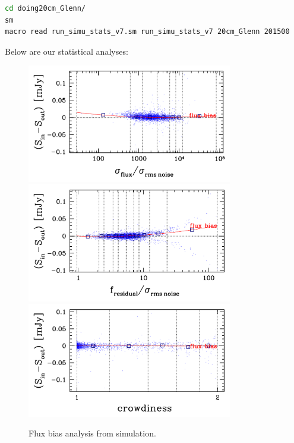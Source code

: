 \documentclass[11pt,a4paper]{article}
\begin{document}
\begin{lstlisting}[language=bash]
cd doing20cm_Glenn/
sm
macro read run_simu_stats_v7.sm run_simu_stats_v7 20cm_Glenn 201500
\end{lstlisting}

Below are our statistical analyses:

\begin{figure}[H]
	\includegraphics[width=0.8\textwidth]{galsim_20cm_Glenn_fbias_1}
	\includegraphics[width=0.8\textwidth]{galsim_20cm_Glenn_fbias_2}
	\includegraphics[width=0.8\textwidth]{galsim_20cm_Glenn_fbias_3}
	\caption{Flux bias analysis from simulation.}
\end{figure}
\end{document}
